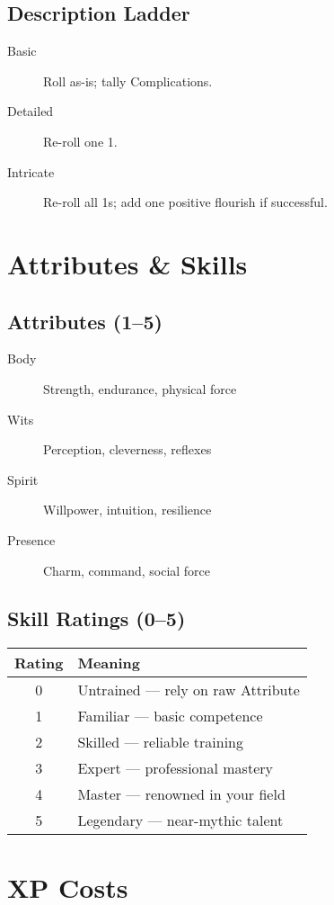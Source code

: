 \subsection*{Description Ladder}
\begin{description}
  \item[Basic] Roll as-is; tally Complications.
  \item[Detailed] Re-roll one 1.
  \item[Intricate] Re-roll all 1s; add one positive flourish if successful.
\end{description}

\section{Attributes \& Skills}

\subsection*{Attributes (1–5)}
\begin{description}
  \item[Body] Strength, endurance, physical force
  \item[Wits] Perception, cleverness, reflexes
  \item[Spirit] Willpower, intuition, resilience
  \item[Presence] Charm, command, social force
\end{description}

\subsection*{Skill Ratings (0–5)}
\begin{center}
\begin{tabular}{cl}
\toprule
\textbf{Rating} & \textbf{Meaning} \\
\midrule
0 & Untrained — rely on raw Attribute \\
1 & Familiar — basic competence \\
2 & Skilled — reliable training \\
3 & Expert — professional mastery \\
4 & Master — renowned in your field \\
5 & Legendary — near-mythic talent \\
\bottomrule
\end{tabular}
\end{center}

\section{XP Costs}

